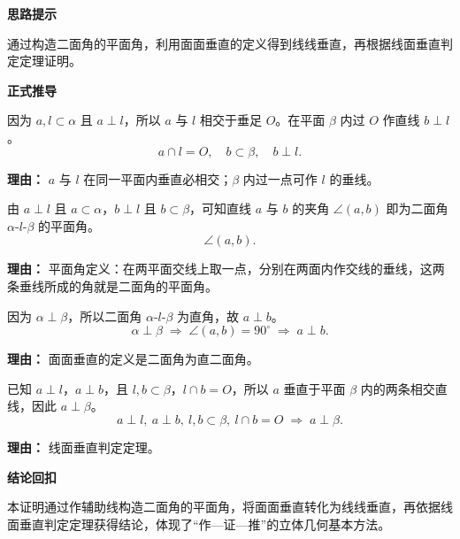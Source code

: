 \begin{proofbox}
	\textbf{\textcolor{CProof}{思路提示}}

	通过构造二面角的平面角，利用面面垂直的定义得到线线垂直，再根据线面垂直判定定理证明。

	\medskip
	\textbf{\textcolor{CProof}{正式推导}}
	\begin{description}[style=nextline, leftmargin=2.8em, labelsep=0.5em, itemsep=0.55em]
		\item[\textbf{步骤一（确定垂足与作线）：}] 因为 $a,l\subset\alpha$ 且 $a\perp l$，所以 $a$ 与 $l$ 相交于垂足 $O$。在平面 $\beta$ 内过 $O$ 作直线 $b\perp l$。
			\[
				a\cap l = O,\quad b\subset\beta,\quad b\perp l.
			\]
			\par\textbf{理由：}
			$a$ 与 $l$ 在同一平面内垂直必相交；$\beta$ 内过一点可作 $l$ 的垂线。

		\item[\textbf{步骤二（平面角构造）：}] 由 $a\perp l$ 且 $a\subset\alpha$，$b\perp l$ 且 $b\subset\beta$，可知直线 $a$ 与 $b$ 的夹角 $\angle(a,b)$ 即为二面角 $\alpha$-$l$-$\beta$ 的平面角。
			\[
				\angle(a,b).
			\]
			\par\textbf{理由：}
			平面角定义：在两平面交线上取一点，分别在两面内作交线的垂线，这两条垂线所成的角就是二面角的平面角。

		\item[\textbf{步骤三（面面垂直条件）：}] 因为 $\alpha\perp\beta$，所以二面角 $\alpha$-$l$-$\beta$ 为直角，故 $a\perp b$。
			\[
				\alpha\perp\beta \;\Rightarrow\; \angle(a,b)=90^\circ \;\Rightarrow\; a\perp b.
			\]
			\par\textbf{理由：}
			面面垂直的定义是二面角为直二面角。

		\item[\textbf{步骤四（线面垂直判定）：}] 已知 $a\perp l$，$a\perp b$，且 $l,b\subset\beta$，$l\cap b=O$，所以 $a$ 垂直于平面 $\beta$ 内的两条相交直线，因此 $a\perp\beta$。
			\[
				a\perp l,\ a\perp b,\ l,b\subset\beta,\ l\cap b=O \;\Rightarrow\; a\perp\beta.
			\]
			\par\textbf{理由：}
			线面垂直判定定理。
	\end{description}

	\medskip
	\textbf{\textcolor{CProof}{结论回扣}}

	本证明通过作辅助线构造二面角的平面角，将面面垂直转化为线线垂直，再依据线面垂直判定定理获得结论，体现了“作—证—推”的立体几何基本方法。
\end{proofbox}
